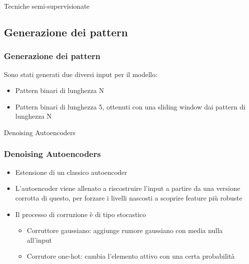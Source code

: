 \documentclass{beamer}
\begin{document}
\begin{section}{Tecniche semi-supervisionate}
\subsection{Generazione dei pattern}
\begin{frame}
\frametitle{Generazione dei pattern}
Sono stati generati due diversi input per il modello:
\begin{itemize}
\item Pattern binari di lunghezza N
\item Pattern binari di lunghezza 5, ottenuti con una sliding window dai pattern di lunghezza N
\end{itemize}
\end{frame}
\end{section}

\begin{section}{Denoising Autoencoders}
\begin{frame}
\frametitle{Denoising Autoencoders}
\begin{itemize}
\item Estensione di un classico autoencoder
\item L'autoencoder viene allenato a riscostruire l'input a partire da una versione corrotta di questo, per forzare i livelli nascosti a scoprire feature pi\`{u} robuste
\item Il processo di corruzione \`{e} di tipo stocastico
\begin{itemize}
\item Corruttore gaussiano: aggiunge rumore gaussiano con media nulla all'input 
\item Corrutore one-hot: cambia l'elemento attivo con una certa probabilit\`{a}
\end{itemize}
\end{itemize}
\end{frame}


\end{section}
\end{document}
